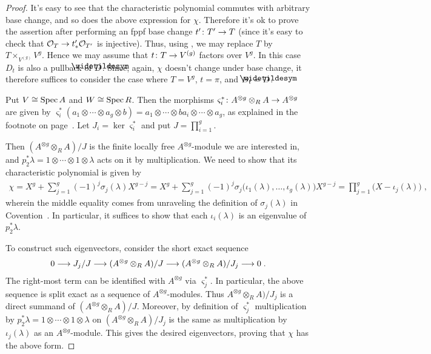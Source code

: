 \documentclass[a4paper,parskip=half,numbers=enddot, DIV=12]{scrreprt}
\begin{document}
\begin{proof}
	It's easy to see that the characteristic polynomial commutes with arbitrary base change, and so does the above expression for $\chi$. Therefore it's ok to prove the assertion after performing an fppf base change  $t'\colon T'\morphism T$ (since it's easy to check that $\Oo_T\morphism t'_*\Oo_{T'}$ is injective). Thus, using , we may replace $T$ by $T\times_{V^{(g)}}V^g$. Hence we may assume that $t\colon T\morphism V^{(g)}$ factors over $V^g$. In this case $D_t$ is also a pullback of $\snake{D}$. Since, again, $\chi$ doesn't change under base change, it therefore suffices to consider the case where $T=V^g$, $t=\pi$, and $D_t=\snake{D}$.
	
	 Put $V\cong \operatorname{Spec} A$ and $W\cong \operatorname{Spec} R$. Then the morphisms $\varsigma_i^*\colon A^{\otimes g}\otimes_RA\morphism A^{\otimes g}$ are given by $\varsigma_i^*(a_1\otimes\cdots\otimes a_g\otimes b)=a_1\otimes\cdots \otimes ba_i\otimes\cdots\otimes a_g$, as explained in the footnote on page~\pageref{footnote:varsigmai}. Let $J_i=\ker\varsigma_i^*$ and put $J=\prod_{i=1}^g$.
	 
	 Then $(A^{\otimes g}\otimes_RA)/J$ is the finite locally free $A^{\otimes g}$-module we are interested in, and $p_2^*\lambda=1\otimes\cdots\otimes 1\otimes \lambda$ acts on it by multiplication. We need to show that its characteristic polynomial is given by
	 \begin{align*}
	 	\chi=X^g+\sum_{j=1}^g(-1)^j\sigma_j(\lambda)X^{g-j}=X^g+\sum_{j=1}^g(-1)^j\sigma_j\big(\iota_1(\lambda),\ldots,\iota_g(\lambda)\big)X^{g-j}=\prod_{j=1}^g\big(X-\iota_j(\lambda)\big)\;,
	 \end{align*}
	 wherein the middle equality comes from unraveling the definition of $\sigma_j(\lambda)$ in Covention~. In particular, it suffices to show that each $\iota_i(\lambda)$ is an eigenvalue of $p_2^*\lambda$.
	 
	 To construct such eigenvectors, consider the short exact sequence
	 \begin{align*}
	 	0\morphism J_j/J\morphism (A^{\otimes g}\otimes_RA)/J\morphism (A^{\otimes g}\otimes_RA)/J_j\morphism 0\;.
	 \end{align*}
	 The right-most term can be identified with $A^{\otimes g}$ via $\varsigma_j^*$. In particular, the above sequence is split exact as a sequence of $A^{\otimes g}$-modules. Thus $A^{\otimes g}\otimes_RA)/J_j$ is a direct summand of $(A^{\otimes g}\otimes_RA)/J$. Moreover, by definition of $\varsigma_j^*$ multiplication by $p_2^*\lambda=1\otimes\cdots\otimes 1\otimes \lambda$ on $(A^{\otimes g}\otimes_RA)/J_j$ is the same as multiplication by $\iota_j(\lambda)$ as an $A^{\otimes g}$-module. This gives the desired eigenvectors, proving that $\chi$ has the above form.
	 

\end{proof}
\end{document}
